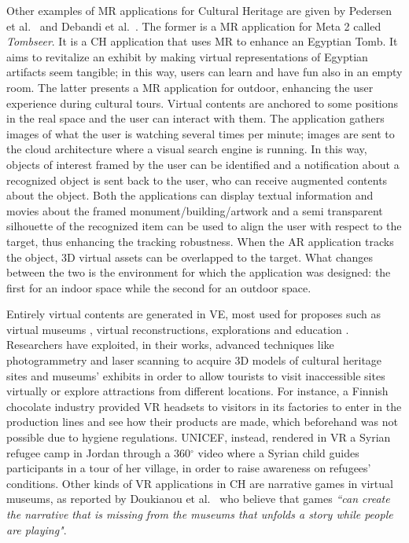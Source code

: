 Other examples of MR applications for Cultural Heritage are given by Pedersen et al.~\cite{pedersen_more_2017} and Debandi et al.~\cite{debandi_enhancing_2018}.
The former is a MR application for Meta 2 called \textit{Tombseer}. It is a CH application that uses MR to enhance an Egyptian Tomb. It aims to revitalize an exhibit by making virtual representations of Egyptian artifacts seem tangible; in this way, users can learn and have fun also in an empty room.
The latter presents a MR application for outdoor, enhancing the user experience during cultural tours. Virtual contents are anchored to some positions in the real space and the user can interact with them. The application gathers images of what the user is watching several times per minute; images are sent to the cloud architecture where a visual search engine is running. In this way, objects of interest framed by the user can be identified and a notification about a recognized object is sent back to the user, who can receive augmented contents about the object. 
Both the applications can display textual information and movies about the framed monument/building/artwork and a semi transparent silhouette of the recognized item can be used to align the user with respect to the target, thus enhancing the tracking robustness. When the AR application tracks the object, 3D virtual assets can be overlapped to the target. What changes between the two is the environment for which the application was designed: the first for an indoor space while the second for an outdoor space.

Entirely virtual contents are generated in VE, most used for proposes such as virtual museums \cite{doukianou_beyond_2020}, virtual reconstructions, explorations and education \cite{bekele_survey_2018}. Researchers have exploited, in their works, advanced techniques like photogrammetry and laser scanning to acquire 3D models of cultural heritage sites and museums' exhibits in order to allow tourists to visit inaccessible sites virtually or explore attractions from different locations. 
For instance, a Finnish chocolate industry provided VR headsets to visitors in its factories to enter in the production lines and see how their products are made, which beforehand was not possible due to hygiene regulations. UNICEF, instead, rendered in VR a Syrian refugee camp in Jordan through a 360$^{\circ}$ video where a Syrian child guides participants in a tour of her village, in order to raise awareness on refugees' conditions.
Other kinds of VR applications in CH are narrative games in virtual museums, as reported by Doukianou et al.~\cite{doukianou_beyond_2020} who believe that games \textit{“can create the narrative that is missing from the museums that unfolds a story while people are playing"}.

